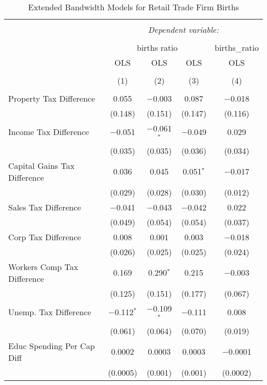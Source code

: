 
\begin{table}[!htbp] \centering 
  \caption{Extended Bandwidth Models for  Retail Trade Firm Births} 
  \label{44-45eb} 
\begin{tabular}{@{\extracolsep{5pt}}lcccc} 
\\[-1.8ex]\hline 
\hline \\[-1.8ex] 
 & \multicolumn{4}{c}{\textit{Dependent variable:}} \\ 
\cline{2-5} 
\\[-1.8ex] & \multicolumn{3}{c}{births ratio} & births\_ratio \\ 
 & OLS & OLS & OLS & OLS \\ 
\\[-1.8ex] & (1) & (2) & (3) & (4)\\ 
\hline \\[-1.8ex] 
 Property Tax Difference & 0.055 & $-$0.003 & 0.087 & $-$0.018 \\ 
  & (0.148) & (0.151) & (0.147) & (0.116) \\ 
  Income Tax Difference & $-$0.051 & $-$0.061$^{*}$ & $-$0.049 & 0.029 \\ 
  & (0.035) & (0.035) & (0.036) & (0.034) \\ 
  Capital Gains Tax Difference & 0.036 & 0.045 & 0.051$^{*}$ & $-$0.017 \\ 
  & (0.029) & (0.028) & (0.030) & (0.012) \\ 
  Sales Tax Difference & $-$0.041 & $-$0.043 & $-$0.042 & 0.022 \\ 
  & (0.049) & (0.054) & (0.054) & (0.037) \\ 
  Corp Tax Difference & 0.008 & 0.001 & 0.003 & $-$0.018 \\ 
  & (0.026) & (0.025) & (0.025) & (0.024) \\ 
  Workers Comp Tax Difference & 0.169 & 0.290$^{*}$ & 0.215 & $-$0.003 \\ 
  & (0.125) & (0.151) & (0.177) & (0.067) \\ 
  Unemp. Tax Difference & $-$0.112$^{*}$ & $-$0.109$^{*}$ & $-$0.111 & 0.008 \\ 
  & (0.061) & (0.064) & (0.070) & (0.019) \\ 
  Educ Spending Per Cap Diff & 0.0002 & 0.0003 & 0.0003 & $-$0.0001 \\ 
  & (0.0005) & (0.001) & (0.001) & (0.0002) \\ 

\end{tabular}
\end{table}
